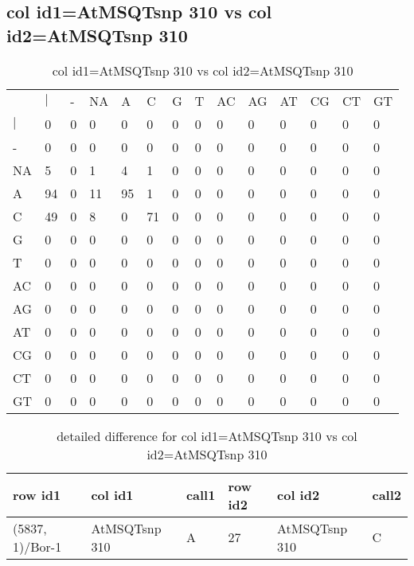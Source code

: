 \subsection{col id1=AtMSQTsnp 310 vs col id2=AtMSQTsnp 310}
\begin{center}
\begin{longtable}{|l|l|l|l|l|l|l|l|l|l|l|l|l|l|}
\caption{col id1=AtMSQTsnp 310 vs col id2=AtMSQTsnp 310} \label{table_dm844}\\
\hline
\\
\hline
&$|$&-&NA&A&C&G&T&AC&AG&AT&CG&CT&GT\\
$|$&0&0&0&0&0&0&0&0&0&0&0&0&0\\
-&0&0&0&0&0&0&0&0&0&0&0&0&0\\
NA&5&0&1&4&1&0&0&0&0&0&0&0&0\\
A&94&0&11&95&1&0&0&0&0&0&0&0&0\\
C&49&0&8&0&71&0&0&0&0&0&0&0&0\\
G&0&0&0&0&0&0&0&0&0&0&0&0&0\\
T&0&0&0&0&0&0&0&0&0&0&0&0&0\\
AC&0&0&0&0&0&0&0&0&0&0&0&0&0\\
AG&0&0&0&0&0&0&0&0&0&0&0&0&0\\
AT&0&0&0&0&0&0&0&0&0&0&0&0&0\\
CG&0&0&0&0&0&0&0&0&0&0&0&0&0\\
CT&0&0&0&0&0&0&0&0&0&0&0&0&0\\
GT&0&0&0&0&0&0&0&0&0&0&0&0&0\\
\hline
\end{longtable}
\end{center}

\begin{center}
\begin{longtable}{|l|l|l|l|l|l|}
\caption{detailed difference for col id1=AtMSQTsnp 310 vs col id2=AtMSQTsnp 310} \label{table_dm845}\\
\hline
row id1&col id1&call1&row id2&col id2&call2\\
\hline
(5837, 1)/Bor-1&AtMSQTsnp 310&A&27&AtMSQTsnp 310&C\\
\hline
\end{longtable}
\end{center}

